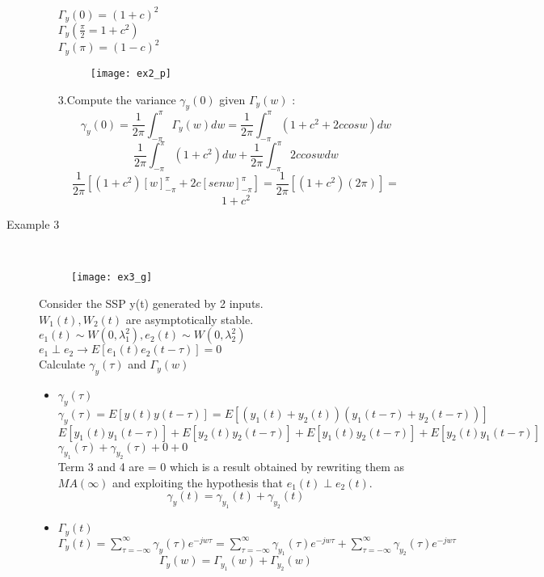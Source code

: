 \begin{description}
\begin{itemize}
$ \Gamma_y(0) = (1+c)^2 $\\
$ \Gamma_y(\frac{\pi}{2} = 1+c^2)$\\
$ \Gamma_y(\pi) = (1-c)^2 $
\begin{figure}[H]
 \centering
  \texttt{[image: ex2\_p]}
\end{figure}
3.Compute the variance $\gamma_y(0)$ given $\Gamma_y(w)$ :
$$ \gamma_y(0) = \frac{1}{2\pi} \int_{-\pi}^{\pi} \Gamma_y(w)dw = \frac{1}{2\pi} \int_{-\pi}^{\pi}(1+c^2 +2ccosw) dw $$ 
$$ \frac{1}{2\pi} \int_{-\pi}^{\pi}(1+c^2)dw + \frac{1}{2\pi} \int_{-\pi}^{\pi} 2ccosw dw $$ $$ \frac{1}{2\pi} [(1+c^2) [w]_{-\pi}^{\pi} + 2c[senw]_{-\pi}^{\pi}] = \frac{1}{2\pi}[(1+c^2)(2\pi)] = $$ $$ 1+c^2$$ 
\end{itemize}
\newpage
\item [Example 3]\hfill\\
\begin{figure}[H]
 \centering
  \texttt{[image: ex3\_g]}
\end{figure}
Consider the SSP y(t) generated by 2 inputs.\\
$W_1(t),W_2(t)$ are asymptotically stable.\\
$ e_1(t) \sim W(0,\lambda_1^2) , e_2(t) \sim W(0,\lambda_2^2) $\\
$ e_1 \perp e_2 \to E[e_1(t)e_2(t-\tau)]=0$\\
Calculate $\gamma_y(\tau)$ and $\Gamma_y(w)$
\begin{itemize}
\item $\gamma_y(\tau)$\\
$\gamma_y(\tau) = E[y(t)y(t-\tau)] = E[(y_1(t)+y_2(t))(y_1(t-\tau)+y_2(t-\tau))]$\\
$ E[y_1(t)y_1(t-\tau)] + E[y_2(t)y_2(t-\tau)] + E[y_1(t)y_2(t-\tau)] + E[y_2(t)y_1(t-\tau)] $ \\
$ \gamma_{y_1}(\tau) + \gamma_{y_2}(\tau) + 0 + 0 $ \\
Term 3 and 4 are = 0 which is a result obtained by rewriting them as $MA(\infty)$ and exploiting the hypothesis that $e_1(t) \perp e_2(t)$.
\[
\boxed{\gamma_y(t)= \gamma_{y_1}(t) + \gamma_{y_2}(t)}
\]
\item $\Gamma_y(t)$\\
$\Gamma_y(t) = \sum\limits_{\tau = -\infty}^{\infty} \gamma_y(\tau)e^{-jw\tau} =
\sum\limits_{\tau = -\infty}^{\infty} \gamma_{y_1}(\tau)e^{-jw\tau} + \sum\limits_{\tau = -\infty}^{\infty} \gamma_{y_2}(\tau)e^{-jw\tau} $ \\ 
\[
\boxed{\Gamma_y(w)=\Gamma_{y_1}(w) + \Gamma_{y_2}(w)}
\]
\end{itemize}
\end{description}
